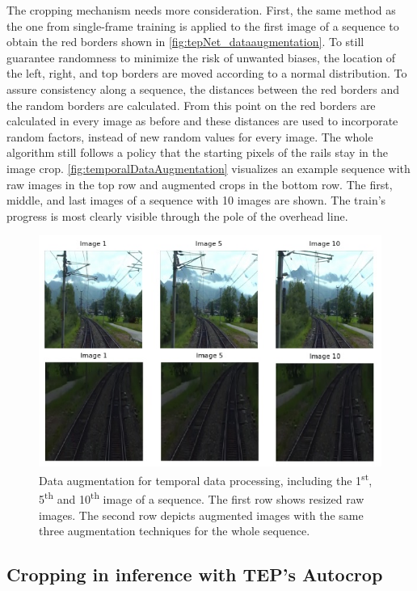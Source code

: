 The cropping mechanism needs more consideration.
First, the same method as the one from single-frame training is applied to the first image of a sequence to obtain the red borders shown in \autoref{fig:tepNet_dataaugmentation}.
To still guarantee randomness to minimize the risk of unwanted biases, the location of the left, right, and top borders are moved according to a normal distribution.
To assure consistency along a sequence, the distances between the red borders and the random borders are calculated.
From this point on the red borders are calculated in every image as before and these distances are used to incorporate random factors, instead of new random values for every image.
The whole algorithm still follows a policy that the starting pixels of the rails stay in the image crop.
\autoref{fig:temporalDataAugmentation} visualizes an example sequence with raw images in the top row and augmented crops in the bottom row.
The first, middle, and last images of a sequence with 10 images are shown.
The train's progress is most clearly visible through the pole of the overhead line. 


\begin{figure}[H]
    \centering
    \includegraphics[width=0.7\linewidth]{PICs//dataAugmentation/temporal_data_augmentation.jpg}
    \caption{Data augmentation for temporal data processing, including the 1\textsuperscript{st}, 5\textsuperscript{th} and 10\textsuperscript{th} image of a sequence. The first row shows resized raw images. The second row depicts augmented images with the same three augmentation techniques for the whole sequence.}
    \label{fig:temporalDataAugmentation}
\end{figure}

\subsection{Cropping in inference with TEP's Autocrop}

